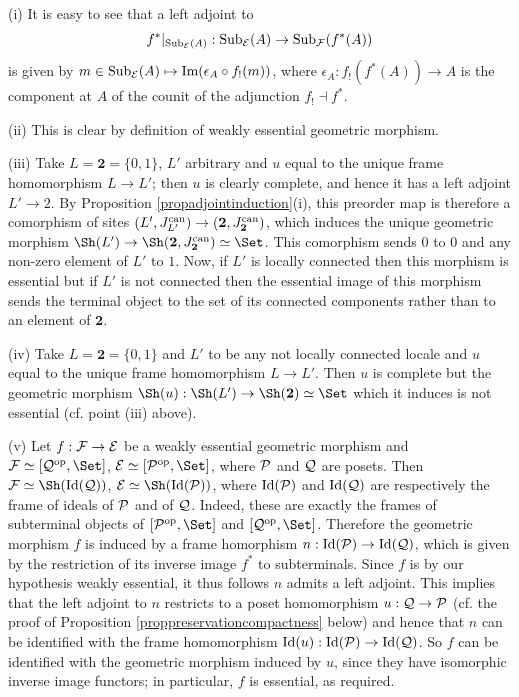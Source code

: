 \documentclass[a4paper,12pt]{article}
\begin{document}
\begin{proofs}
	(i) It is easy to see that a left adjoint to $$f^{\ast}|_{\textup{Sub}_{\cal E}(A)}:\textup{Sub}_{\cal E}(A)\to \textup{Sub}_{\cal F}(f^{\ast}(A))$$ is given by $m\in \textup{Sub}_{\cal E}(A) \mapsto \textup{Im}(\epsilon_{A}\circ f_{!}(m))$, where $\epsilon_{A}:f_{!}(f^{\ast}(A))\to A$ is the component at $A$ of the counit of the adjunction $f_{!}\dashv f^{\ast}$.  
	
	(ii) This is clear by definition of weakly essential geometric morphism.
	
	(iii) Take $L=\textbf{2}=\{0,1\}$, $L'$ arbitrary and $u$ equal to the unique frame homomorphism $L \to L'$; then $u$ is clearly complete, and hence it has a left adjoint $L'\to 2$. By Proposition \ref{propadjointinduction}(i), this preorder map is therefore a comorphism of sites $(L', J^{\textup{can}}_{L'})\to (\textbf{2}, J^{\textup{can}}_{\textbf{2}})$, which induces the unique geometric morphism $\Sh(L')\to \Sh(\textbf{2}, J^{\textup{can}}_{\textbf{2}})\simeq \Set$. This comorphism sends $0$ to $0$ and any non-zero element of $L'$ to $1$. Now, if $L'$ is locally connected then this morphism is essential but if $L'$ is not connected then the essential image of this morphism sends the terminal object to the set of its connected components rather than to an element of $\textbf{2}$. 
	
	(iv) Take $L=\textbf{2}=\{0,1\}$ and $L'$ to be any not locally connected locale and $u$ equal to the unique frame homomorphism $L \to L'$. Then $u$ is complete but the geometric morphism $\Sh(u):\Sh(L')\to \Sh(\textbf{2})\simeq \Set$ which it induces is not essential (cf. point (iii) above).	
	
	(v) Let $f:{\cal F}\to {\cal E}$ be a weakly essential geometric morphism and ${\cal F}\simeq [{\cal Q}^{\textup{op}}, \Set]$, ${\cal E}\simeq [{\cal P}^{\textup{op}}, \Set]$, where $\cal P$ and $\cal Q$ are posets. Then ${\cal F}\simeq \Sh(\textup{Id}(\cal Q))$, ${\cal E}\simeq \Sh(\textup{Id}(\cal P))$, where $\textup{Id}(\cal P)$ and $\textup{Id}(\cal Q)$ are respectively the frame of ideals of $\cal P$ and of $\cal Q$. Indeed, these are exactly the frames of subterminal objects of $[{\cal P}^{\textup{op}}, \Set]$ and $[{\cal Q}^{\textup{op}}, \Set]$. Therefore the geometric morphism $f$ is induced by a frame homorphism $n:\textup{Id}(\cal P)\to \textup{Id}(\cal Q)$, which is given by the restriction of its inverse image $f^{\ast}$ to subterminals. Since $f$ is by our hypothesis weakly essential, it thus follows $n$ admits a left adjoint. This implies that the left adjoint to $n$ restricts to a poset homomorphism $u:{\cal Q}\to {\cal P}$ (cf. the proof of Proposition \ref{proppreservationcompactness} below) and hence that $n$ can be identified with the frame homomorphism $\textup{Id}(u):\textup{Id}({\cal P}) \to \textup{Id}({\cal Q})$. So $f$ can be identified with the geometric morphism induced by $u$, since they have isomorphic inverse image functors; in particular, $f$ is essential, as required. 
\end{proofs}
\end{document}
